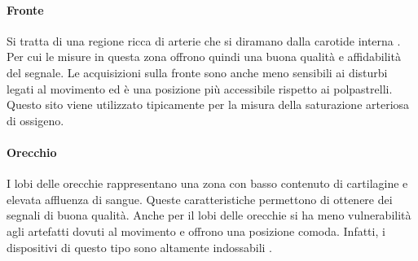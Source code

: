 	 \paragraph{Fronte}
	 Si tratta di una regione ricca di arterie che si diramano dalla carotide interna \cite{Abay2019}. Per cui le misure in questa zona offrono quindi una buona qualità e affidabilità del segnale. Le acquisizioni sulla fronte sono anche meno sensibili ai disturbi legati al movimento ed è una posizione più accessibile rispetto ai polpastrelli. Questo sito viene utilizzato tipicamente per la misura della saturazione arteriosa di ossigeno. 
 	 \paragraph{Orecchio}
	 I lobi delle orecchie rappresentano una zona con basso contenuto di cartilagine e elevata affluenza di sangue. Queste caratteristiche permettono di ottenere dei segnali di buona qualità. Anche per il lobi delle orecchie si ha meno vulnerabilità agli artefatti dovuti al movimento e offrono una posizione comoda. Infatti, i dispositivi di questo tipo sono altamente indossabili \cite{Ghamari2018}\cite{Vescio2018}.

 
